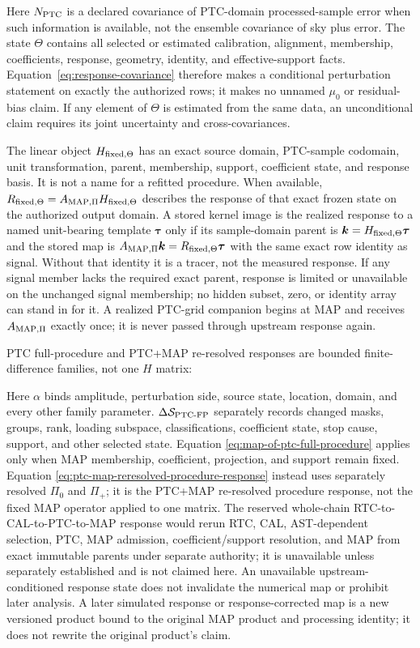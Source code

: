 \documentclass[10pt]{article}
\begin{document}
Here \(N_{\rm PTC}\) is a declared covariance of PTC-domain processed-sample
error when such information is available, not the ensemble
covariance of sky plus error. The state \(\Theta\) contains all selected or
estimated calibration, alignment, membership, coefficients, response,
geometry, identity, and effective-support facts.
Equation~\eqref{eq:response-covariance} therefore makes a conditional
perturbation statement on exactly the authorized rows; it makes no unnamed
\(\mu_0\) or residual-bias claim. If any element of \(\Theta\) is
estimated from the same data, an unconditional claim requires its joint
uncertainty and cross-covariances.

The linear object \(H_{{\rm fixed},\Theta}\) has an exact source domain,
PTC-sample codomain, unit transformation, parent, membership, support,
coefficient state, and response basis. It is not a name for a refitted
procedure. When available,
\(R_{{\rm fixed},\Theta}=A_{{\rm MAP},\Pi}H_{{\rm fixed},\Theta}\) describes
the response of that exact frozen state on the authorized output domain.
A stored kernel image is the realized response to a named unit-bearing
template \(\boldsymbol\tau\) only if its sample-domain parent is
\(\boldsymbol k=H_{{\rm fixed},\Theta}\boldsymbol\tau\) and the stored map is
\(A_{{\rm MAP},\Pi}\boldsymbol k=R_{{\rm fixed},\Theta}\boldsymbol\tau\) with the same exact row
identity as signal. Without that identity it is a tracer, not the measured
response. If any signal member lacks the required exact parent, response is
limited or unavailable on the unchanged signal membership; no hidden subset,
zero, or identity array can stand in for it. A realized PTC-grid companion
begins at MAP and receives \(A_{{\rm MAP},\Pi}\) exactly once; it is never
passed through upstream response again.

PTC full-procedure and PTC+MAP re-resolved responses are bounded
finite-difference families, not one \(H\) matrix:

\SCIMapProcedureResponseEquations

Here \(\alpha\) binds amplitude, perturbation side, source state, location,
domain, and every other family parameter.
\(\Delta\mathcal S_{{\rm PTC}\text{-}{\rm FP}}\) separately
records changed masks, groups, rank, loading subspace, classifications,
coefficient state, stop cause, support, and other selected state. Equation
\eqref{eq:map-of-ptc-full-procedure} applies only when MAP membership,
coefficient, projection, and support remain fixed. Equation
\eqref{eq:ptc-map-reresolved-procedure-response} instead uses separately
resolved \(\Pi_0\) and \(\Pi_+\); it is the PTC+MAP re-resolved procedure
response, not the fixed MAP operator applied to one matrix. The reserved
whole-chain RTC-to-CAL-to-PTC-to-MAP response would rerun RTC, CAL,
AST-dependent selection, PTC, MAP admission, coefficient/support resolution,
and MAP from exact immutable parents under separate authority; it is
unavailable unless separately established and is not claimed here. An
unavailable upstream-conditioned response state does not invalidate the numerical map
or prohibit later analysis. A
later simulated response or response-corrected map is a new versioned product
bound to the original MAP product and processing identity; it does not rewrite
the original product's claim.
\end{document}
